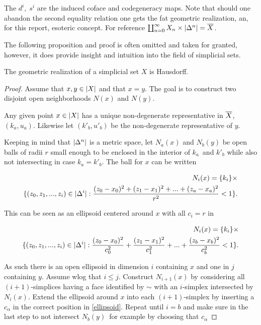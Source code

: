 \documentclass[../../main.tex]{subfiles}
\begin{document}
    The $d^i,\; s^i$ are the induced coface and codegeneracy maps. Note that should one abandon the second equality relation one gets the fat geometric realization, an, for this report, esoteric concept. For reference $\coprod_{n=0}^{\infty} X_n \times \geom[\Delta^n]= \bigGeom X$.

    The following proposition and proof is often omitted and taken for granted, however, it does provide insight and intuition into the field of simplicial sets. 

    \begin{proposition}
        The geometric realization of a simplicial set $X$ is Hausdorff.
    \end{proposition}

    \begin{proof}
        Assume that $x, y \in \geom[X]$ and that $x = y$. The goal is to construct two disjoint open neighborhoods $N(x)$ and $N(y)$.

        Any given point $x \in \geom[X]$ has a unique non-degenerate representative in $\bigGeom X$, $(k_a, u_a)$. Likewise let $(k'_b, u'_b)$ be the non-degenerate representative of $y$.

        Keeping in mind that $\geom[\Delta^n]$ is a metric space, let $N_a(x)$ and $N_b(y)$ be open balls of radii $r$ small enough to be enclosed in the interior of $k_a$ and $k'_b$ while also not intersecting in case $k_a=k'_b$. The ball for $x$ can be written 
        
        \begin{align*}
            N_i(x) = \{k_i\} \times \\
            \{(z_0, z_1, ..., z_i) \in \geom[\Delta^i]: \frac{(z_0-x_0)^2 + (z_1-x_1)^2 + ... + (z_a-x_a)^2}{r^2} < 1 \}.
        \end{align*}

        This can be seen as an ellipsoid centered around $x$ with all $c_i = r$ in

        \begin{align}\label{ellipsoid}
            N_i(x) = \{k_i\} \times \nonumber \\
            \{(z_0, z_1, ..., z_i) \in \geom[\Delta^i]: \frac{(z_0-x_0)^2}{c_0^2} + \frac{(z_1-x_1)^2}{c_1^2} + ... + \frac{(z_b-x_b)^2}{c_b^2} < 1 \}.
        \end{align}

        As such there is an open ellipsoid in dimension $i$ containing $x$ and one in $j$ containing $y$. Assume wlog that $i \leq j$. Construct $N_{i+1}(x)$ by considering all $(i+1)$-simplices having a face identified by $\sim$ with an $i$-simplex intersected by $N_i(x)$. Extend the ellipsoid around $x$ into each $(i+1)$-simplex by inserting a $c_\alpha$ in the correct position in \eqref{ellipsoid}. Repeat until $i = b$ and make sure in the last step to not intersect $N_b(y)$ for example by choosing that $c_\alpha$


\end{proof}
\end{document}
